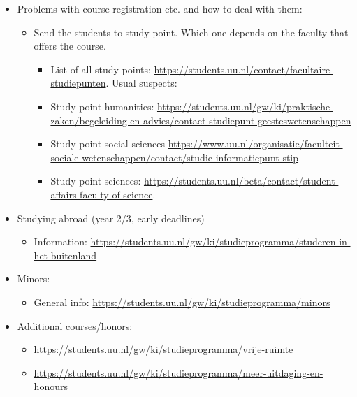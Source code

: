 \begin{itemize}
\begin{itemize}
		\end{itemize}

		\item Problems with course registration etc. and how to deal with them:

			\begin{itemize}

				\item Send the students to study point. Which one depends on the faculty that offers the course.

				\begin{itemize}

				\item List of all study points: \url{https://students.uu.nl/contact/facultaire-studiepunten}.
                                  Usual suspects:

				\item Study point humanities: \url{https://students.uu.nl/gw/ki/praktische-zaken/begeleiding-en-advies/contact-studiepunt-geesteswetenschappen}

				\item Study point social sciences \url{https://www.uu.nl/organisatie/faculteit-sociale-wetenschappen/contact/studie-informatiepunt-stip}

				\item Study point sciences: \url{https://students.uu.nl/beta/contact/student-affairs-faculty-of-science}.

				\end{itemize}

			\end{itemize}

		\item Studying abroad (year 2/3, early deadlines)

			\begin{itemize}


				\item Information: \url{https://students.uu.nl/gw/ki/studieprogramma/studeren-in-het-buitenland}

			\end{itemize}

		\item Minors:

			\begin{itemize}

				\item General info: \url{https://students.uu.nl/gw/ki/studieprogramma/minors}

			\end{itemize}

		\item Additional courses/honors:

			\begin{itemize}

				\item \url{https://students.uu.nl/gw/ki/studieprogramma/vrije-ruimte}

				\item \url{https://students.uu.nl/gw/ki/studieprogramma/meer-uitdaging-en-honours}

			\end{itemize}

		\end{itemize}
